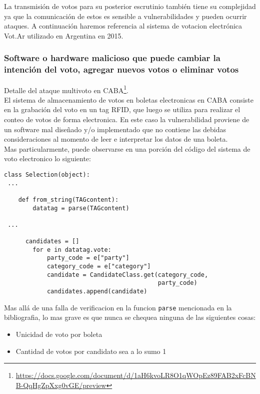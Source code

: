 La transmisión de votos para su posterior escrutinio también tiene su complejidad ya que la comunicación de estos es sensible a vulnerabilidades y pueden ocurrir ataques. A continuación haremos referencia al sistema de votacion electrónica Vot.Ar utilizado en Argentina en 2015.

\subsubsection{Software o hardware malicioso que puede cambiar la intención del voto, agregar nuevos votos o eliminar votos}	
Detalle del ataque multivoto en CABA\footnote{\url{https://docs.google.com/document/d/1aH6kvoLR8O1qWOpEz89FAB2xFcBNB-QqHgZpXxg0vGE/preview}}.\\

El sistema de almacenamiento de votos en boletas electronicas en CABA consiste en la grabación del voto en un tag RFID, que luego se utiliza para realizar el conteo de votos de forma electronica. En este caso la vulnerabilidad proviene de un software mal diseñado y/o implementado que no contiene las debidas consideraciones al momento de leer e interpretar los datos de una boleta.\\

Mas particularmente, puede observarse en una porción del código del sistema de voto electronico lo siguiente:

\begin{lstlisting}
class Selection(object):
 ...

    def from_string(TAGcontent):
        datatag = parse(TAGcontent)

 ...
 
      candidates = []
        for e in datatag.vote:
            party_code = e["party"]
            category_code = e["category"]
            candidate = CandidateClass.get(category_code,
                                           party_code)
            candidates.append(candidate)

\end{lstlisting}

Mas allá de una falla de verificacion en la funcion \texttt{parse} mencionada en la bibliografia, lo mas grave es que nunca se chequea ninguna de las siguientes cosas:
\begin{itemize}
	\item Unicidad de voto por boleta
	\item Cantidad de votos por candidato sea a lo sumo 1
\end{itemize} 

